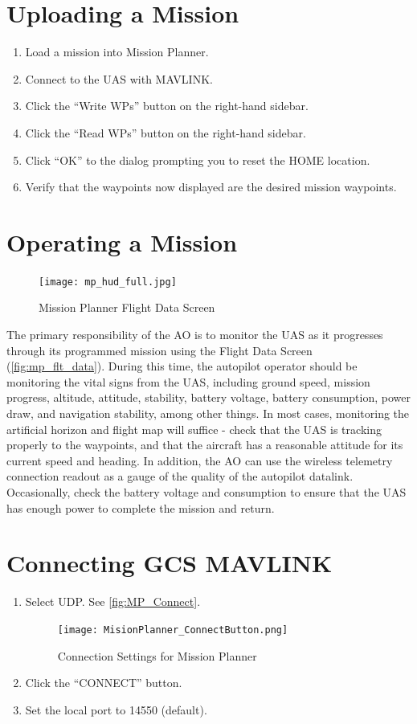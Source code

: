 \documentclass{report}
\begin{document}
	\section{Uploading a Mission}
		\begin{enumerate}
			\item Load a mission into Mission Planner.
			\item Connect to the \gls{UAS} with MAVLINK.
			\item Click the ``Write WPs'' button on the right-hand sidebar.
			\item Click the ``Read WPs'' button on the right-hand sidebar.
			\item Click ``OK'' to the dialog prompting you to reset the HOME location.
			\item Verify that the waypoints now displayed are the desired mission waypoints.
		\end{enumerate}
	\section{Operating a Mission}
		\begin{figure}[ht]
			\centering
			\caption{Mission Planner Flight Data Screen}
			\texttt{[image: mp\_hud\_full.jpg]}
			\label{fig:mp_flt_data}
		\end{figure}
		The primary responsibility of the \gls{AO} is to monitor the \gls{UAS} as it progresses through its programmed mission using the Flight Data Screen (\autoref{fig:mp_flt_data}).  During this time, the autopilot operator should be monitoring the vital signs from the \gls{UAS}, including ground speed, mission progress, altitude, attitude, stability, battery voltage, battery consumption, power draw, and navigation stability, among other things.  In most cases, monitoring the artificial horizon and flight map will suffice - check that the \gls{UAS} is tracking properly to the waypoints, and that the aircraft has a reasonable attitude for its current speed and heading.  In addition, the \gls{AO} can use the wireless telemetry connection readout as a gauge of the quality of the autopilot datalink.  Occasionally, check the battery voltage and consumption to ensure that the \gls{UAS} has enough power to complete the mission and return.
	\section{Connecting GCS MAVLINK}
		\begin{enumerate}
			\item Select UDP.  See \autoref{fig:MP_Connect}.
				\begin{figure}[ht]
					\centering
					\caption{Connection Settings for Mission Planner}
					\texttt{[image: MisionPlanner\_ConnectButton.png]}
					\label{fig:MP_Connect}
				\end{figure}
			\item Click the ``CONNECT'' button.
			\item Set the local port to 14550 (default).
		\end{enumerate}	
		
\end{document}
